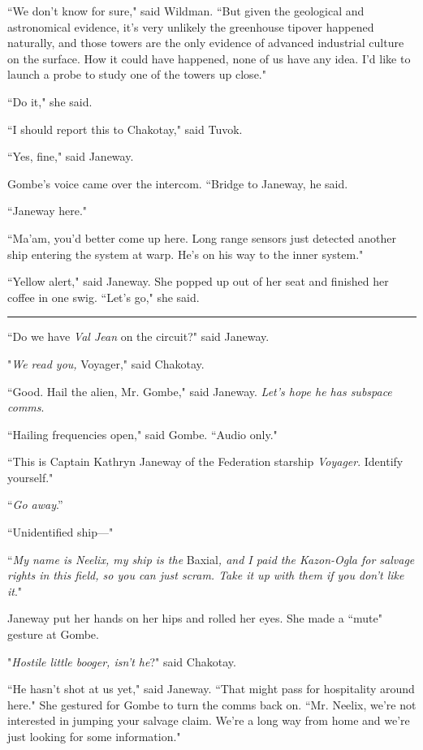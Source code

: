 \documentclass[twoside,letterpaper,12pt]{memoir}
\begin{document}
``We don't know for sure," said Wildman. ``But given the geological and astronomical evidence, it’s very unlikely the greenhouse tipover happened naturally, and those towers are the only evidence of advanced industrial culture on the surface. How it could have happened, none of us have any idea. I’d like to launch a probe to study one of the towers up close."

``Do it," she said.

``I should report this to Chakotay," said Tuvok.

``Yes, fine," said Janeway.

Gombe's voice came over the intercom. ``Bridge to Janeway, he said.

``Janeway here."

``Ma'am, you'd better come up here. Long range sensors just detected another ship entering the system at warp. He's on his way to the inner system."

``Yellow alert," said Janeway. She popped up out of her seat and finished her coffee in one swig. ``Let's go," she said.

\fancybreak{\rule{3cm}{0.4 pt}}
``Do we have \textit{Val Jean} on the circuit?" said Janeway.

"\textit{We read you, }Voyager," said Chakotay.

``Good. Hail the alien, Mr. Gombe," said Janeway. \textit{Let's hope he has subspace comms}.

``Hailing frequencies open," said Gombe. ``Audio only."

``This is Captain Kathryn Janeway of the Federation starship \textit{Voyager}. Identify yourself."

``\textit{Go away}.''

``Unidentified ship---"

``\textit{My name is Neelix, my ship is the }Baxial\textit{, and I paid the Kazon-Ogla for salvage rights in this field, so you can just scram. Take it up with them if you don't like it}."

Janeway put her hands on her hips and rolled her eyes. She made a ``mute" gesture at Gombe.

"\textit{Hostile little booger, isn't he}?" said Chakotay.

``He hasn't shot at us yet," said Janeway. ``That might pass for hospitality around here." She gestured for Gombe to turn the comms back on. ``Mr. Neelix, we're not interested in jumping your salvage claim. We're a long way from home and we're just looking for some information."
\end{document}
